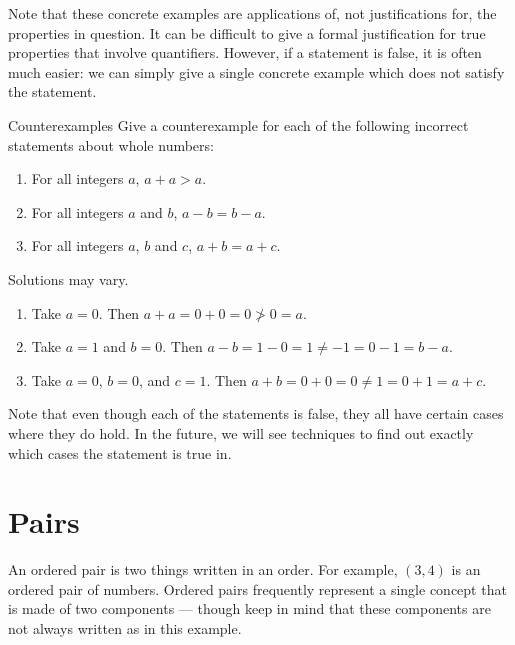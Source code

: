 \documentclass[a4paper,10pt]{report}
\begin{document}
Note that these concrete examples are applications of, not justifications for, the
properties in question. It can be difficult to give a formal justification for true
properties that involve quantifiers. However, if a statement is false, it is often much
easier: we can simply give a single concrete example which does not satisfy the statement.

\begin{problem}{Counterexamples}
  Give a counterexample for each of the following incorrect statements about whole numbers:

  \begin{enumerate}
    \item For all integers \(a\), \(a + a > a\).
    \item For all integers \(a\) and \(b\), \(a - b = b - a\).
    \item For all integers \(a\), \(b\) and \(c\), \(a + b = a + c\).
  \end{enumerate}

  \begin{solution}
    Solutions may vary.

    \begin{enumerate}
      \item Take \(a = 0\). Then \(a + a = 0 + 0 = 0 \not > 0 = a\).
      \item Take \(a = 1\) and \(b = 0\). Then \(a - b = 1 - 0 = 1 \ne -1 = 0 - 1 = b - a\).
      \item Take \(a = 0\), \(b = 0\), and \(c = 1\). Then \(a + b = 0 + 0 = 0 \ne 1 = 0 + 1
      = a + c\).
    \end{enumerate}
  \end{solution}
\end{problem}

Note that even though each of the statements is false, they all have certain cases where
they do hold. In the future, we will see techniques to find out exactly which cases the
statement is true in.

\section{Pairs}

An \gls{ordered pair} is two things written in an order. For example, \((3, 4)\) is an
ordered pair of numbers. Ordered pairs frequently represent a single concept that is made of
two components --- though keep in mind that these components are not always written as in
this example.
\end{document}
